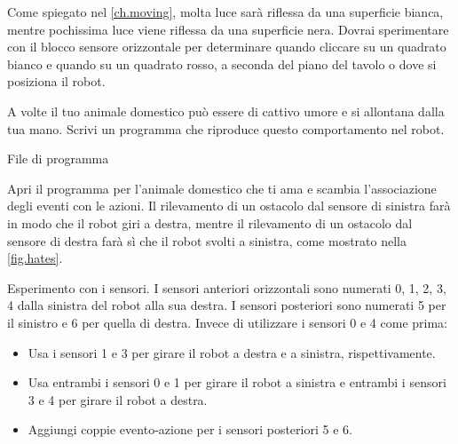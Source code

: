 Come spiegato nel \cref{ch.moving}, molta luce sarà riflessa
da una superficie bianca, mentre pochissima luce viene riflessa da una
superficie nera.
Dovrai sperimentare con il blocco sensore orizzontale per determinare quando cliccare su un quadrato bianco e quando su un quadrato rosso, a seconda del piano del tavolo o dove si posiziona il robot.





A volte il tuo animale domestico può essere di cattivo umore e si allontana dalla tua mano.
Scrivi un programma che riproduce questo comportamento nel robot.

{\raggedleft \hfill File di programma }

Apri il programma per l'animale domestico che ti ama e scambia l'associazione
degli eventi con le azioni. Il rilevamento di un ostacolo dal sensore di sinistra
farà in modo che il robot giri a destra, mentre il rilevamento di un ostacolo dal sensore di destra farà sì che il robot svolti a sinistra, come mostrato nella \cref{fig.hates}.


{
Esperimento con i sensori.
I sensori anteriori orizzontali sono numerati 0, 1, 2, 3, 4 dalla sinistra del robot alla sua destra.
I sensori posteriori sono numerati 5 per il sinistro e 6 per quella di destra.
Invece di utilizzare i sensori 0 e 4 come prima:
\begin{itemize}[noitemsep,nosep,leftmargin=*]
\item Usa i sensori 1 e 3 per girare il robot a destra e a sinistra,
rispettivamente.
\item Usa entrambi i sensori 0 e 1 per girare il robot a sinistra e entrambi i sensori 3
e 4 per girare il robot a destra.
\item Aggiungi coppie evento-azione per i sensori posteriori 5 e 6.
\end{itemize}
}


